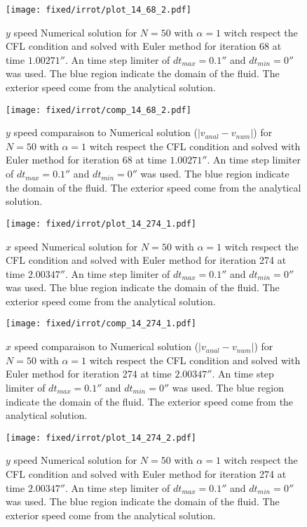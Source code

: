 \begin{figure}
\texttt{[image: fixed/irrot/plot\_14\_68\_2.pdf]}
\caption{$y$ speed Numerical solution for $N=50$ with $\alpha=1$ witch respect the CFL condition and solved with Euler method
for iteration 68 at time $\unit{1.00271}{\second}$.
An time step limiter of $dt_{max}=\unit{0.1}{\second}$ and $dt_{min}=\unit{0}{\second}$ was used.
The blue region indicate the domain of the fluid. The exterior speed come from the analytical solution.
\label{fix:plot_14_68_2}
}
\end{figure}

\begin{figure}
\texttt{[image: fixed/irrot/comp\_14\_68\_2.pdf]}
\caption{$y$ speed comparaison to Numerical solution ($|v_{anal}-v_{num}|$) for $N=50$ with $\alpha=1$ witch respect the CFL condition and solved with Euler method
for iteration 68 at time $\unit{1.00271}{\second}$.
An time step limiter of $dt_{max}=\unit{0.1}{\second}$ and $dt_{min}=\unit{0}{\second}$ was used.
The blue region indicate the domain of the fluid. The exterior speed come from the analytical solution.
\label{fix:comp_14_68_2}
}
\end{figure}

\clearpage


\begin{figure}
\texttt{[image: fixed/irrot/plot\_14\_274\_1.pdf]}
\caption{$x$ speed Numerical solution for $N=50$ with $\alpha=1$ witch respect the CFL condition and solved with Euler method
for iteration 274 at time $\unit{2.00347}{\second}$.
An time step limiter of $dt_{max}=\unit{0.1}{\second}$ and $dt_{min}=\unit{0}{\second}$ was used.
The blue region indicate the domain of the fluid. The exterior speed come from the analytical solution.
\label{fix:plot_14_274_1}
}
\end{figure}

\begin{figure}
\texttt{[image: fixed/irrot/comp\_14\_274\_1.pdf]}
\caption{$x$ speed comparaison to Numerical solution ($|v_{anal}-v_{num}|$) for $N=50$ with $\alpha=1$ witch respect the CFL condition and solved with Euler method
for iteration 274 at time $\unit{2.00347}{\second}$.
An time step limiter of $dt_{max}=\unit{0.1}{\second}$ and $dt_{min}=\unit{0}{\second}$ was used.
The blue region indicate the domain of the fluid. The exterior speed come from the analytical solution.
\label{fix:comp_14_274_1}
}
\end{figure}

\begin{figure}
\texttt{[image: fixed/irrot/plot\_14\_274\_2.pdf]}
\caption{$y$ speed Numerical solution for $N=50$ with $\alpha=1$ witch respect the CFL condition and solved with Euler method
for iteration 274 at time $\unit{2.00347}{\second}$.
An time step limiter of $dt_{max}=\unit{0.1}{\second}$ and $dt_{min}=\unit{0}{\second}$ was used.
The blue region indicate the domain of the fluid. The exterior speed come from the analytical solution.
\label{fix:plot_14_274_2}
}
\end{figure}

